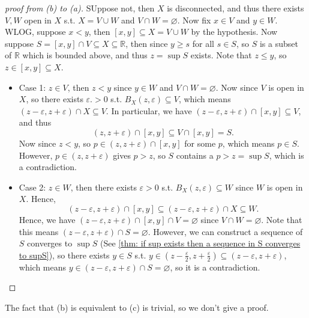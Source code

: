 \begin{proof}[proof from (b) to (a)]
    SUppose not, then \(X\) is disconnected, and thus there exists \(V, W\) open in \(X\) s.t. \(X = V \cup W\) and \(V \cap W = \varnothing \). Now fix \(x \in V\) and \(y \in W\). WLOG, suppose \(x < y\), then \([x, y] \subseteq X = V \cup W\) by the hypothesis. Now suppose \(S = [x, y] \cap V \subseteq X \subseteq \mathbb{R} \), then since \(y \ge s\) for all \(s \in S\), so \(S\) is a subset of \(\mathbb{R} \) which is bounded above, and thus \(z = \sup S\) exists. Note that \(z \le y\), so \(z \in [x, y] \subseteq X\). 
    \begin{itemize}
        \item Case 1: \(z \in V\), then \(z < y\) since \(y \in W\) and \(V \cap W = \varnothing \). Now since \(V\) is open in \(X\), so there exists \(\varepsilon .> 0\) s.t. \(B_X(z, \varepsilon ) \subseteq V\), which means \((z - \varepsilon , z + \varepsilon ) \cap X \subseteq V\). In particular, we have \((z - \varepsilon , z + \varepsilon ) \cap [x, y] \subseteq V\), and thus
        \[
            (z, z + \varepsilon ) \cap [x, y] \subseteq V \cap [x, y] = S.
        \] Now since \(z < y\), so \(p \in (z, z+ \varepsilon ) \cap [x, y]\) for some \(p\), which means \(p \in S\). However, \(p \in (z, z + \varepsilon )\) gives \(p > z\), so \(S\) contains a \(p > z = \sup S\), which is a contradiction. 
        \item Case 2: \(z \in W\), then there exists \(\varepsilon > 0\) s.t. \(B_X(z, \varepsilon ) \subseteq W\) since \(W\) is open in \(X\). Hence, 
        \[
            (z - \varepsilon , z + \varepsilon ) \cap [x, y] \subseteq (z - \varepsilon , z + \varepsilon ) \cap X \subseteq W. 
        \]
        Hence, we have \((z - \varepsilon , z + \varepsilon ) \cap [x, y] \cap V = \varnothing \) since \(V \cap W = \varnothing \). Note that this means \((z - \varepsilon, z + \varepsilon) \cap S = \varnothing \). However, we can construct a sequence of \(S\) converges to \(\sup S\) (See \autoref{thm: if sup exists then a sequence in S converges to supS}), so there exists \(y \in S\) s.t. \(y \in \left( z - \frac{\varepsilon}{2}, z + \frac{\varepsilon}{2} \right) \subseteq (z - \varepsilon , z + \varepsilon )\), which means \(y \in (z - \varepsilon , z + \varepsilon ) \cap S = \varnothing \), so it is a contradiction.         
    \end{itemize}                 
\end{proof}

\begin{remark}
    The fact that (b) is equivalent to (c) is trivial, so we don't give a proof.
\end{remark}